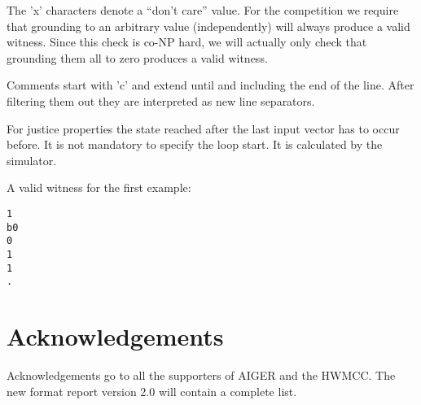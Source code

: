 \documentclass{llncs}
\begin{document}
The 'x' characters denote a ``don't care'' value.  For the competition
we require that grounding to an arbitrary value (independently) will
always produce a valid witness.  Since this check is co-NP hard, we
will actually only check that grounding them all to zero produces
a valid witness.

Comments start with 'c' and extend until and including the end of the line.
After filtering them out they are interpreted as new line separators.

For justice properties the state reached after the last input vector
has to occur before.  It is not mandatory to specify the
loop start.  It is calculated by the simulator.

A valid witness for the first example:
{\small
\begin{verbatim}
1
b0
0
1
1
.
\end{verbatim}}

\section{Acknowledgements}

Acknowledgements go to all the supporters of AIGER and the HWMCC.
The new format report version 2.0 will contain a complete list.
\end{document}
